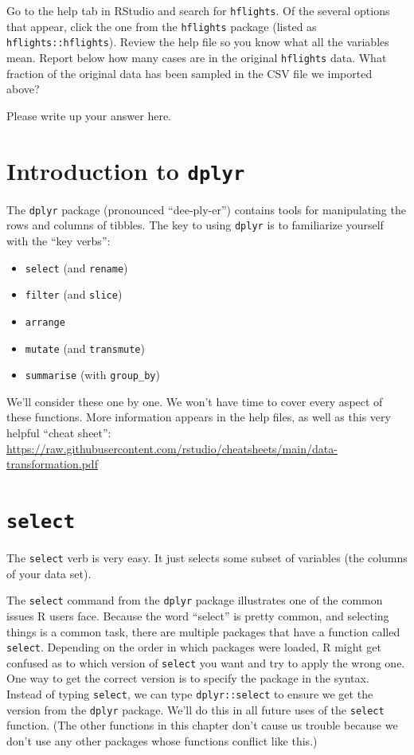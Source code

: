 \documentclass[
]{book}
\providecommand{\tightlist}{%
  \setlength{\itemsep}{0pt}\setlength{\parskip}{0pt}}
\begin{document}
Go to the help tab in RStudio and search for \texttt{hflights}. Of the several options that appear, click the one from the \texttt{hflights} package (listed as \texttt{hflights::hflights}). Review the help file so you know what all the variables mean. Report below how many cases are in the original \texttt{hflights} data. What fraction of the original data has been sampled in the CSV file we imported above?

Please write up your answer here.

\hypertarget{manipulating-dplyr}{%
\section{\texorpdfstring{Introduction to \texttt{dplyr}}{Introduction to dplyr}}\label{manipulating-dplyr}}

The \texttt{dplyr} package (pronounced ``dee-ply-er'') contains tools for manipulating the rows and columns of tibbles. The key to using \texttt{dplyr} is to familiarize yourself with the ``key verbs'':

\begin{itemize}
\tightlist
\item
  \texttt{select} (and \texttt{rename})
\item
  \texttt{filter} (and \texttt{slice})
\item
  \texttt{arrange}
\item
  \texttt{mutate} (and \texttt{transmute})
\item
  \texttt{summarise} (with \texttt{group\_by})
\end{itemize}

We'll consider these one by one. We won't have time to cover every aspect of these functions. More information appears in the help files, as well as this very helpful ``cheat sheet'': \url{https://raw.githubusercontent.com/rstudio/cheatsheets/main/data-transformation.pdf}

\hypertarget{manipulating-select}{%
\section{\texorpdfstring{\texttt{select}}{select}}\label{manipulating-select}}

The \texttt{select} verb is very easy. It just selects some subset of variables (the columns of your data set).

The \texttt{select} command from the \texttt{dplyr} package illustrates one of the common issues R users face. Because the word ``select'' is pretty common, and selecting things is a common task, there are multiple packages that have a function called \texttt{select}. Depending on the order in which packages were loaded, R might get confused as to which version of \texttt{select} you want and try to apply the wrong one. One way to get the correct version is to specify the package in the syntax. Instead of typing \texttt{select}, we can type \texttt{dplyr::select} to ensure we get the version from the \texttt{dplyr} package. We'll do this in all future uses of the \texttt{select} function. (The other functions in this chapter don't cause us trouble because we don't use any other packages whose functions conflict like this.)
\end{document}
